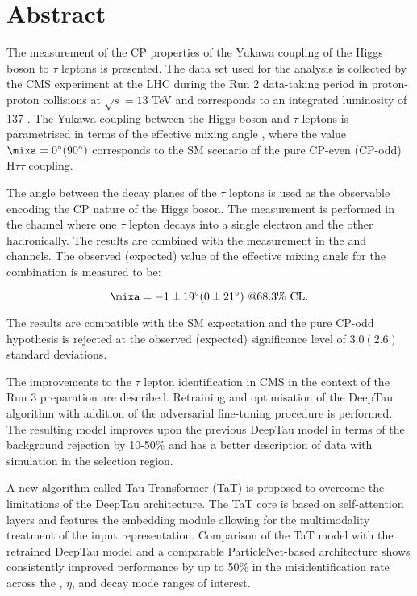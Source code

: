 \thispagestyle{empty}
\vspace{-3cm}
\section*{\centering Abstract}

\noindent

The measurement of the CP properties of the Yukawa coupling of the Higgs boson to $\tau$ leptons is presented. The data set used for the analysis is collected by the CMS experiment at the LHC during the Run 2 data-taking period in proton-proton collisions at $\sqrt{s}=13$ TeV and corresponds to an integrated luminosity of 137 \ifb. The Yukawa coupling between the Higgs boson and $\tau$ leptons is parametrised in terms of the effective mixing angle \mixa, where the value $\mixa = 0^\circ (90^\circ)$ corresponds to the SM scenario of the pure CP-even (CP-odd) $\text{H}\tau\tau$ coupling. 

The angle between the decay planes of the $\tau$ leptons is used as the observable encoding the CP nature of the Higgs boson. The measurement is performed in the \et channel where one $\tau$ lepton decays into a single electron and the other hadronically. The results are combined with the measurement in the \mt and \tata channels. The observed (expected) value of the effective mixing angle for the combination is measured to be:

\begin{equation}
    \mixa = -1 \pm 19^\circ (0 \pm 21^\circ) ~@68.3\% \text{ CL}.
\end{equation}

The results are compatible with the SM expectation and the pure CP-odd hypothesis is rejected at the observed (expected) significance level of $3.0 (2.6)$ standard deviations.

The improvements to the $\tau$ lepton identification in CMS in the context of the Run 3 preparation are described. Retraining and optimisation of the DeepTau algorithm with addition of the adversarial fine-tuning procedure is performed. The resulting model improves upon the previous DeepTau model in terms of the background rejection by 10-50\% and has a better description of data with simulation in the \htt selection region. 

A new algorithm called Tau Transformer (TaT) is proposed to overcome the limitations of the DeepTau architecture. The TaT core is based on self-attention layers and features the embedding module allowing for the multimodality treatment of the input representation. Comparison of the TaT model with the retrained DeepTau model and a comparable ParticleNet-based architecture shows consistently improved performance by up to 50\% in the misidentification rate across the \pt, $\eta$, and decay mode ranges of interest.   

\newpage
\thispagestyle{empty}
\mbox{}


